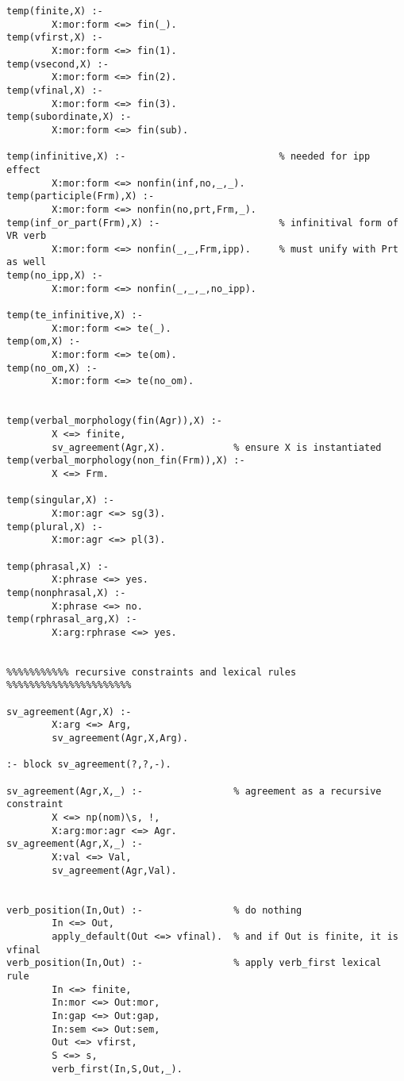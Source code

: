 \begin{verbatim}
temp(finite,X) :-
        X:mor:form <=> fin(_).
temp(vfirst,X) :-
        X:mor:form <=> fin(1).
temp(vsecond,X) :-
        X:mor:form <=> fin(2).
temp(vfinal,X) :-
        X:mor:form <=> fin(3).
temp(subordinate,X) :-
        X:mor:form <=> fin(sub).
        
temp(infinitive,X) :-                           % needed for ipp effect 
        X:mor:form <=> nonfin(inf,no,_,_).
temp(participle(Frm),X) :-
        X:mor:form <=> nonfin(no,prt,Frm,_).
temp(inf_or_part(Frm),X) :-                     % infinitival form of VR verb
        X:mor:form <=> nonfin(_,_,Frm,ipp).     % must unify with Prt as well
temp(no_ipp,X) :-                               
        X:mor:form <=> nonfin(_,_,_,no_ipp).    
        
temp(te_infinitive,X) :-
        X:mor:form <=> te(_).
temp(om,X) :-
        X:mor:form <=> te(om).
temp(no_om,X) :-
        X:mor:form <=> te(no_om).

        
temp(verbal_morphology(fin(Agr)),X) :-
        X <=> finite,
        sv_agreement(Agr,X).            % ensure X is instantiated
temp(verbal_morphology(non_fin(Frm)),X) :-
        X <=> Frm.
        
temp(singular,X) :-
        X:mor:agr <=> sg(3).
temp(plural,X) :-
        X:mor:agr <=> pl(3).

temp(phrasal,X) :-
        X:phrase <=> yes.
temp(nonphrasal,X) :-
        X:phrase <=> no.
temp(rphrasal_arg,X) :-
        X:arg:rphrase <=> yes.


%%%%%%%%%%% recursive constraints and lexical rules %%%%%%%%%%%%%%%%%%%%%%
                
sv_agreement(Agr,X) :-
        X:arg <=> Arg,
        sv_agreement(Agr,X,Arg).
        
:- block sv_agreement(?,?,-).

sv_agreement(Agr,X,_) :-                % agreement as a recursive constraint
        X <=> np(nom)\s, !,             
        X:arg:mor:agr <=> Agr.
sv_agreement(Agr,X,_) :-
        X:val <=> Val,
        sv_agreement(Agr,Val).
        
        
verb_position(In,Out) :-                % do nothing 
        In <=> Out,
        apply_default(Out <=> vfinal).  % and if Out is finite, it is vfinal
verb_position(In,Out) :-                % apply verb_first lexical rule
        In <=> finite,                  
        In:mor <=> Out:mor,             
        In:gap <=> Out:gap,
        In:sem <=> Out:sem,
        Out <=> vfirst,
        S <=> s,
        verb_first(In,S,Out,_).
        

\end{verbatim}
